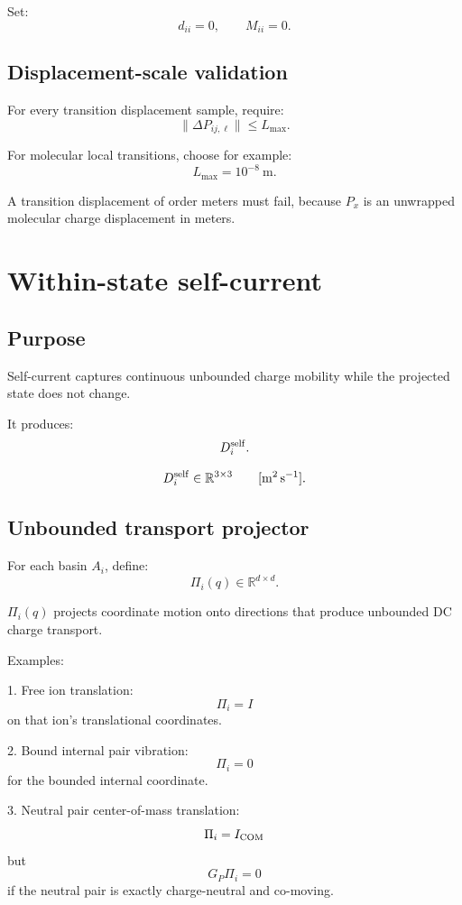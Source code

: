\documentclass[11pt]{article}
\newcommand{\R}{\mathbb R}
\begin{document}
  Set:
  \[
  d_{ii}=0,
  \qquad
  M_{ii}=0.
  \]

  \subsection{Displacement-scale validation}

  For every transition displacement sample, require:
  \[
  \|\Delta P_{ij,\ell}\| \le L_{\max}.
  \]

  For molecular local transitions, choose for example:
  \[
  L_{\max}=10^{-8}\ \mathrm{m}.
  \]

  A transition displacement of order meters must fail, because \(P_x\) is an
  unwrapped molecular charge displacement in meters.

  \section{Within-state self-current}

  \subsection{Purpose}

  Self-current captures continuous unbounded charge mobility while the projected
  state does not change.

  It produces:
  \[
  D_i^{\rm self}.
  \]

  \[
  D_i^{\rm self}\in\R^{3\times3}
  \qquad [\mathrm{m^2\,s^{-1}}].
  \]

  \subsection{Unbounded transport projector}

  For each basin \(A_i\), define:
  \[
  \Pi_i(q)\in\R^{d\times d}.
  \]

  \(\Pi_i(q)\) projects coordinate motion onto directions that produce
  unbounded DC charge transport.

  Examples:

  1. Free ion translation:
  \[
  \Pi_i=I
  \]
  on that ion's translational coordinates.

  2. Bound internal pair vibration:
  \[
  \Pi_i=0
  \]
  for the bounded internal coordinate.

  3. Neutral pair center-of-mass translation:
  \[
  \Pi_i=I_{\rm COM}
  \]
  but
  \[
  G_P\Pi_i=0
  \]
  if the neutral pair is exactly charge-neutral and co-moving.
\end{document}
